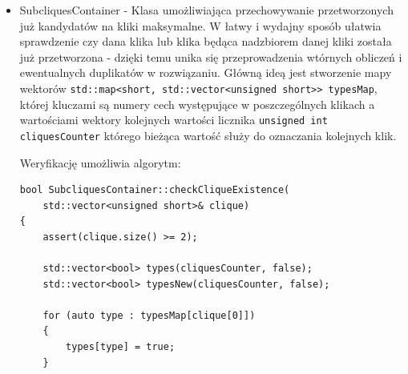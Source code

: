 \documentclass[12pt]{article}
\newcounter{algorytm}
\def\inline{\lstinline[basicstyle=\ttfamily,keywordstyle={}]}
\begin{document}
\begin{itemize}
\begin{minipage}{\linewidth}
\begin{lstlisting}[caption={Kod metody tomitaMaximalPivot umożliwiającej wyliczenie optymalnego punktu \textit{pivot}}]
unsigned short Graph::tomitaMaximalPivot(
	const std::vector<unsigned short>& SUBG,
    const std::vector<unsigned short>& CAND)
{
	unsigned short u, maxCardinality = 0;
	for (auto s : SUBG)
	{
		auto neighbors = getVertexNeighbours(s);
		std::sort(neighbors.begin(), neighbors.end());
		
		std::vector<unsigned short> nCANDunion(neighbors.size() + CAND.size());
        
		auto itUnion = std::set_union(
        	CAND.begin(),
            CAND.end(),
            neighbors.begin(),
            neighbors.end(),
            nCANDunion.begin());
            
		nCANDunion.resize(itUnion - nCANDunion.begin());
		if (nCANDunion.size() >= maxCardinality)
		{
			u = s;
			maxCardinality = nCANDunion.size();
		}
	}
	return u;
}
\end{lstlisting}
\end{minipage}

\item SubcliquesContainer - Klasa umożliwiająca przechowywanie przetworzonych już kandydatów na kliki maksymalne. W łatwy i wydajny sposób ułatwia sprawdzenie czy dana klika lub klika będąca nadzbiorem danej kliki została już przetworzona - dzięki temu unika się przeprowadzenia wtórnych obliczeń i ewentualnych duplikatów w rozwiązaniu. Główną ideą jest stworzenie mapy wektorów \inline{std::map<short, std::vector<unsigned short>> typesMap}, której kluczami są numery cech występujące w poszczególnych klikach a wartościami wektory kolejnych wartości licznika \inline{unsigned int cliquesCounter} którego bieżąca wartość służy do oznaczania kolejnych klik.

Weryfikację umożliwia algorytm:
\begin{minipage}{\linewidth}
\begin{lstlisting}[caption={Kod metody checkCliqueExistence klasy SubcliquesContainer}]
bool SubcliquesContainer::checkCliqueExistence(
	std::vector<unsigned short>& clique)
{
	assert(clique.size() >= 2);

	std::vector<bool> types(cliquesCounter, false);
	std::vector<bool> typesNew(cliquesCounter, false);

	for (auto type : typesMap[clique[0]])
	{
		types[type] = true;
	}


\end{lstlisting}
\end{minipage}
\end{itemize}
\end{document}
